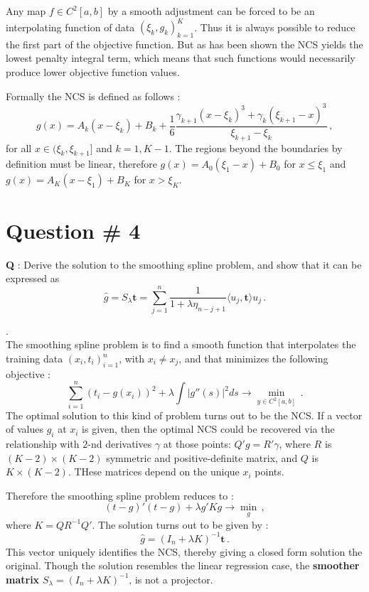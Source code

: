 \documentclass[a4paper]{article}
\begin{document}
Any map $f\in C^2[a,b]$ by a smooth adjustment can be forced to be an interpolating
function of data $(\xi_k, g_k)_{k=1}^K$. Thus it is always possible to reduce the
first part of the objective function. But as has been shown the NCS yields the lowest
penalty integral term, which means that such functions would necessarily produce
lower objective function values.

Formally the NCS is defined as follows :
\[
g(x)
= A_k(x - \xi_k) + B_k + \frac{1}{6}
	\frac{\gamma_{k+1}(x-\xi_k)^3+\gamma_k(\xi_{k+1}-x)^3}{\xi_{k+1}-\xi_k}\,,
\]
for all $x\in (\xi_k,\xi_{k+1}]$ and $k=1, K-1$. The regions beyond the boundaries
by definition must be linear, therefore $g(x) = A_0 (\xi_1-x) + B_0$ for $x\leq \xi_1$
and $g(x) = A_K (x-\xi_1) + B_K$ for $x > \xi_K$.


\clearpage

\section{Question \# 4} %
\label{sec:question_4}
\textbf{\large \textbf{Q}} : Derive the solution to the smoothing spline problem,
and show that it can be expressed as
\[ \hat{g} = S_\lambda \mathbf{t} = \sum_{j=1}^n \frac{1}{1+\lambda \eta_{n-j+1}} \langle u_j, \mathbf{t} \rangle u_j \,. \]

 .\hfill\\
The smoothing spline problem is to find a smooth function that interpolates the
training data $(x_i,t_i)_{i=1}^n$, with $x_i\neq x_j$, and that minimizes the following
objective :
\[
\sum_{i=1}^n (t_i - g(x_i))^2 + \lambda \int |g''(s)|^2 ds \to \min_{y\in C^2[a,b]}\,.
\]
The optimal solution to this kind of problem turns out to be the NCS. If a vector
of values $g_i$ at $x_i$ is given, then the optimal NCS could be recovered via the
relationship with $2$-nd derivatives $\gamma$ at those points: $Q'g = R'\gamma$,
where $R$ is $(K-2)\times(K-2)$ symmetric and positive-definite matrix, and $Q$
is $K\times(K-2)$. THese matrices depend on the unique $x_i$ points.

Therefore the smoothing spline problem reduces to :
\[ (t - g)'(t - g) + \lambda g'K g \to \min_g \,,\]
where $K = Q R^{-1} Q'$. The solution turns out to be given by :
\[ \hat{g} = (I_n + \lambda K)^{-1} \mathbf{t} \,. \]
This vector uniquely identifies the NCS, thereby giving a closed form solution 
the original. Though the solution resembles the linear regression case, the \textbf{
smoother matrix} $S_\lambda = (I_n + \lambda K)^{-1}$, is not a projector.
\end{document}

